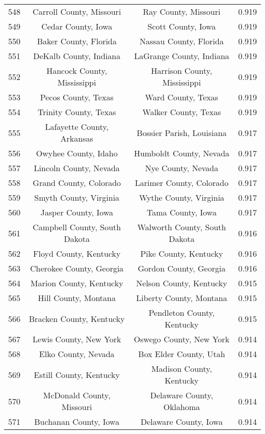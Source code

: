 \begin{longtable}{cccc}
  548 & Carroll County, Missouri & Ray County, Missouri & 0.919 \\ 
  549 & Cedar County, Iowa & Scott County, Iowa & 0.919 \\ 
  550 & Baker County, Florida & Nassau County, Florida & 0.919 \\ 
  551 & DeKalb County, Indiana & LaGrange County, Indiana & 0.919 \\ 
  552 & Hancock County, Mississippi & Harrison County, Mississippi & 0.919 \\ 
  553 & Pecos County, Texas & Ward County, Texas & 0.919 \\ 
  554 & Trinity County, Texas & Walker County, Texas & 0.919 \\ 
  555 & Lafayette County, Arkansas & Bossier Parish, Louisiana & 0.917 \\ 
  556 & Owyhee County, Idaho & Humboldt County, Nevada & 0.917 \\ 
  557 & Lincoln County, Nevada & Nye County, Nevada & 0.917 \\ 
  558 & Grand County, Colorado & Larimer County, Colorado & 0.917 \\ 
  559 & Smyth County, Virginia & Wythe County, Virginia & 0.917 \\ 
  560 & Jasper County, Iowa & Tama County, Iowa & 0.917 \\ 
  561 & Campbell County, South Dakota & Walworth County, South Dakota & 0.916 \\ 
  562 & Floyd County, Kentucky & Pike County, Kentucky & 0.916 \\ 
  563 & Cherokee County, Georgia & Gordon County, Georgia & 0.916 \\ 
  564 & Marion County, Kentucky & Nelson County, Kentucky & 0.915 \\ 
  565 & Hill County, Montana & Liberty County, Montana & 0.915 \\ 
  566 & Bracken County, Kentucky & Pendleton County, Kentucky & 0.915 \\ 
  567 & Lewis County, New York & Oswego County, New York & 0.914 \\ 
  568 & Elko County, Nevada & Box Elder County, Utah & 0.914 \\ 
  569 & Estill County, Kentucky & Madison County, Kentucky & 0.914 \\ 
  570 & McDonald County, Missouri & Delaware County, Oklahoma & 0.914 \\ 
  571 & Buchanan County, Iowa & Delaware County, Iowa & 0.914 \\ 

\end{longtable}
